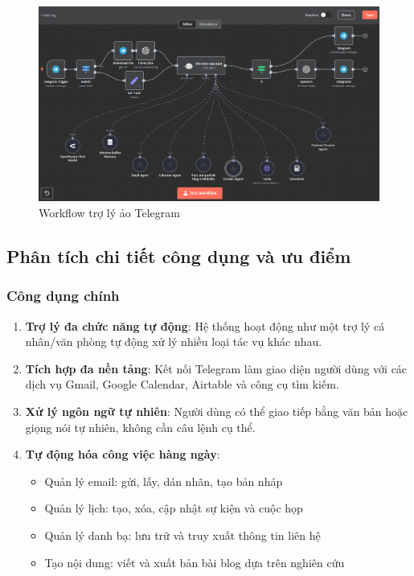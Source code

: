     \begin{figure}[H]
    \centering
    \includegraphics[width=1\textwidth]{images/4chatbot01.png}
    \caption{Workflow trợ lý ảo Telegram}
    \end{figure}


\subsection{Phân tích chi tiết công dụng và ưu điểm}

\subsubsection{Công dụng chính}
\begin{enumerate}
    \item \textbf{Trợ lý đa chức năng tự động}: Hệ thống hoạt động như một trợ lý cá nhân/văn phòng tự động xử lý nhiều loại tác vụ khác nhau.
    
    \item \textbf{Tích hợp đa nền tảng}: Kết nối Telegram làm giao diện người dùng với các dịch vụ Gmail, Google Calendar, Airtable và công cụ tìm kiếm.
    
    \item \textbf{Xử lý ngôn ngữ tự nhiên}: Người dùng có thể giao tiếp bằng văn bản hoặc giọng nói tự nhiên, không cần câu lệnh cụ thể.
    
    \item \textbf{Tự động hóa công việc hàng ngày}:
    \begin{itemize}
        \item Quản lý email: gửi, lấy, dán nhãn, tạo bản nháp
        \item Quản lý lịch: tạo, xóa, cập nhật sự kiện và cuộc họp
        \item Quản lý danh bạ: lưu trữ và truy xuất thông tin liên hệ
        \item Tạo nội dung: viết và xuất bản bài blog dựa trên nghiên cứu
    \end{itemize}
\end{enumerate}

